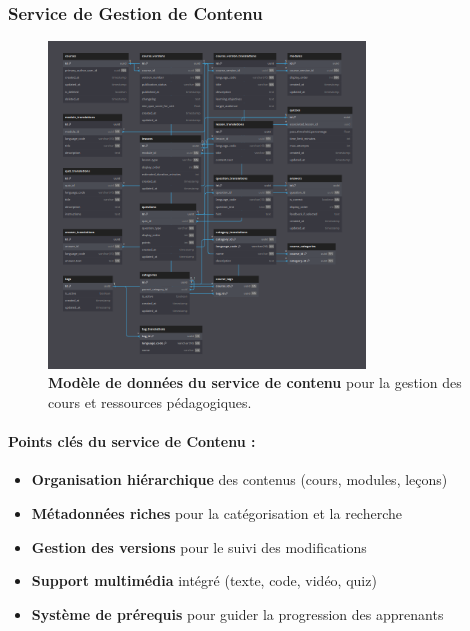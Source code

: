 \subsubsection{Service de Gestion de Contenu}
\begin{figure}[H]
  \centering
  \includegraphics[width=0.75\textwidth,keepaspectratio]{week_1_img/services_db_screanshots/Screenshot 2025-06-06 at 15-07-51 Content_Service.pdf.png}
  \caption{\textbf{Modèle de données du service de contenu} pour la gestion des cours et ressources pédagogiques.}
  \label{fig:content_service}
\end{figure}

\small
\paragraph{Points clés du service de Contenu :}
\begin{itemize}[leftmargin=*,noitemsep,topsep=0pt]
  \item \textbf{Organisation hiérarchique} des contenus (cours, modules, leçons)
  \item \textbf{Métadonnées riches} pour la catégorisation et la recherche
  \item \textbf{Gestion des versions} pour le suivi des modifications
  \item \textbf{Support multimédia} intégré (texte, code, vidéo, quiz)
  \item \textbf{Système de prérequis} pour guider la progression des apprenants
\end{itemize}
\normalsize

